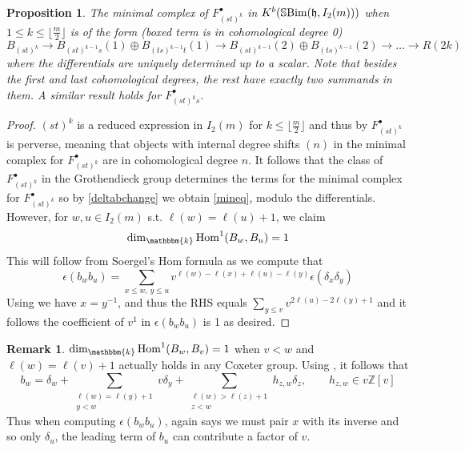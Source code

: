 \documentclass[10pt]{article}
\numberwithin{theorem}{section}
\newtheorem{prop}[theorem]{Proposition}
\theoremstyle{definition}
\newtheorem*{remark}{Remark}
\newcommand{\kb}{\mathbbm{k}}
\renewcommand{\hom}{\mathrm{Hom}}
\newcommand{\hf}{\mathfrak{h}}
\newcommand{\sbim}{\mathbb{S}\textnormal{Bim}}
\newcommand{\Zb}{\mathbb{Z}}
\newcommand{\0}{\ \raisebox{-2ex}{\begin{tikzpicture}[xscale=0.25,yscale=0.3,thick,baseline]
 \draw (0,0) -- (0,3); 
\end{tikzpicture}}}
\renewcommand{\1}{\ \raisebox{-2ex}{\begin{tikzpicture}[xscale=0.25,yscale=0.3,thick,baseline]
 \draw (0,0) -- (0,1);
 \draw (0,2) -- (0,3);
 \node[dot] at (0,1) {};
  \node[dot] at (0,2) {};
\end{tikzpicture}}}
\begin{document}
\begin{prop}
    The minimal complex of $F^\bullet_{(st)^k}$ in $K^b(\sbim(\hf  ,I_2(m)))$ when $1\le k\le \lfloor\frac{m}{2}\rfloor$ is of the form (boxed term is in cohomological degree 0)
    \begin{equation}
    \label{mineq}
        \boxed{B_{(st)^k}} \xrightarrow{} B_{(st)^{k-1}s}(1) \oplus B_{(ts)^{k-1}t}(1) \xrightarrow{} B_{(st)^{k-1}}(2) \oplus B_{(ts)^{k-1}}(2)\to \ldots \to R(2k)   
    \end{equation} 
    where the differentials are uniquely determined up to a scalar. Note that besides the first and last cohomological degrees, the rest have exactly two summands in them. A similar result holds for $F^\bullet_{(st)^ks}$.
\end{prop}
\begin{proof}
    $(st)^k$ is a reduced expression in $I_2(m)$ for $k\le \lfloor\frac{m}{2}\rfloor$ and thus by \cite[Theorem 19.47]{EMTW20} $F^\bullet_{(st)^k}$ is perverse, meaning that objects with internal degree shifts $(n)$ in the minimal complex for $F^\bullet_{(st)^k}$ are in cohomological degree $n$. It follows that the class of $F^\bullet_{(st)^k}$ in the Grothendieck group determines the terms for the minimal complex for $F^\bullet_{(st)^k}$ so by \cref{deltabchange} we obtain \cref{mineq}, modulo the differentials. However, for $w,u\in I_2(m)$ s.t. $\ell(w)=\ell(u)+1$, we claim
    \[ \dim_\kb \hom^1( B_w, B_u )=1 \]
    This will follow from Soergel's Hom formula as we compute that
    $$\epsilon(b_wb_u)=\sum_{x\le w, \, y\le u}v^{\ell(w)-\ell(x)+\ell(u)-\ell(y)} \epsilon( \delta_x \delta_y)$$
    Using \cite[Lemma 3.15]{EMTW20} we have $x=y^{-1}$, and thus the RHS equals $\sum_{y\le v}v^{2\ell(u)-2\ell(y)+1}  $ and it follows the coefficient of $v^1$ in $\epsilon(b_wb_u)$ is 1 as desired.
\end{proof}
\begin{remark}
    $\dim_\kb \hom^1( B_w, B_v )=1 $ when $v<w$ and $\ell(w)=\ell(v)+1$ actually holds in any Coxeter group. Using \cite[Lemma 3.26]{EMTW20}, it follows that 
    $$  b_w=\delta_w+\sum_{\substack{ \ell(w)=\ell(y)+1 \\ y<w}}v\delta_y+\sum_{\substack{ \ell(w)>\ell(z)+1 \\ z<w}} h_{z,w} \delta_{z}, \qquad h_{z,w}\in v\Zb[v]$$
    Thus when computing $\epsilon(b_wb_u)$, \cite[Lemma 3.15]{EMTW20} again says we must pair $x$ with its inverse and so only $\delta_u$, the leading term of $b_u$ can contribute a factor of $v$.
\end{remark}
\end{document}
